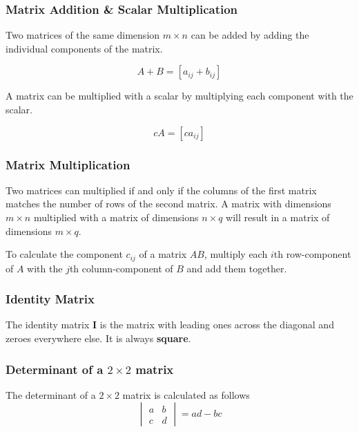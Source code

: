 \subsubsection{Matrix Addition \& Scalar Multiplication}
Two matrices of the same dimension \(m \times n\) can be added by adding the individual components of the matrix.

\begin{equation}
	A + B = [a_{ij} + b_{ij}]
\end{equation}

A matrix can be multiplied with a scalar by multiplying each component with the scalar.

\begin{equation}
	cA = [ca_{ij}]
\end{equation}

\subsubsection{Matrix Multiplication}

Two matrices can multiplied if and only if the columns of the first matrix matches the number of rows of the second matrix. A matrix with dimensions \(m \times n \) multiplied with a matrix of dimensions \(n \times q\) will result in a matrix of dimensions \(m \times q\).

To calculate the component \(c_{ij}\) of a matrix \(AB\), multiply each \(i\)th row-component of \(A\) with the \(j\)th column-component of \(B\) and add them together.

\subsubsection{Identity Matrix}

The identity matrix \(\mathbf{I} \) is the matrix with leading ones across the diagonal and zeroes everywhere else. It is always \textbf{square}.

\subsubsection{Determinant of a \texorpdfstring{\( 2 \times 2 \)}{2 by 2} matrix}

The determinant of a \(2 \times 2\) matrix is calculated as follows
\[
	\begin{vmatrix}
		a & b \\
		c & d
	\end{vmatrix}
	=
	ad - bc
\]

